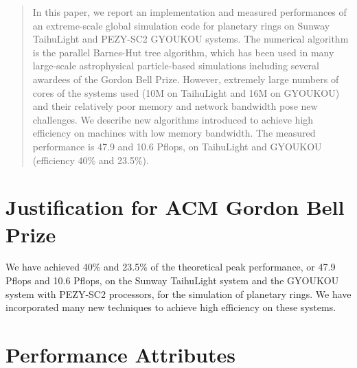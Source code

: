 \documentclass[conference]{IEEEtran}
\begin{document}
\begin{abstract}
  In this paper, we report an implementation and measured performances
  of an extreme-scale global simulation code for planetary rings on
  Sunway TaihuLight and PEZY-SC2 GYOUKOU systems.
  The numerical algorithm is the parallel Barnes-Hut tree algorithm,
  which has been used in many large-scale astrophysical particle-based
  simulations including several awardees of the Gordon Bell
  Prize. However, extremely large numbers of cores of the systems
  used (10M on TaihuLight and 16M on GYOUKOU)  and their relatively poor
  memory and network bandwidth pose new challenges. We describe 
  new algorithms introduced to achieve high efficiency on machines
  with low memory bandwidth.  The measured
  performance is 47.9 and 10.6 Pflops, on TaihuLight and GYOUKOU
  (efficiency  40\% and 23.5\%). 
\end{abstract}





%
\IEEEpeerreviewmaketitle

\section{Justification for ACM Gordon Bell Prize}


We have achieved 40\% and 23.5\% of the theoretical peak performance,
or 47.9 Pflops and 10.6 Pflops, on the Sunway TaihuLight system and
the GYOUKOU system with PEZY-SC2 processors, for the simulation of
planetary rings.  We have incorporated many new techniques to achieve
high efficiency on these systems.



\section{Performance Attributes}
\end{document}
